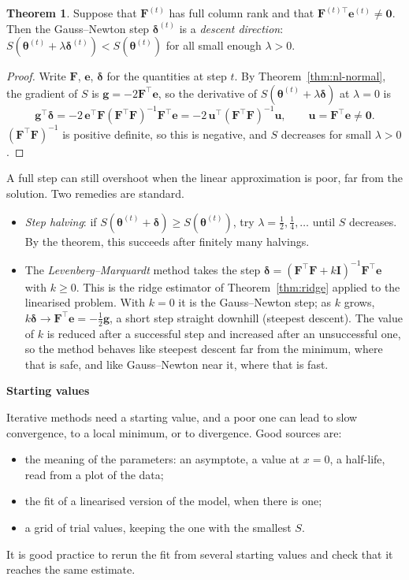 \documentclass[11pt,a4paper]{article}
\numberwithin{equation}{section}
\theoremstyle{definition}
\newtheorem{thm}{Theorem}[subsection]
\newcommand{\subhead}[1]{%
  \par\medskip\noindent\textbf{#1}\par\nobreak\smallskip}
\begin{document}
\begin{thm}\label{thm:gn-descent}
Suppose that $\mathbf{F}^{(t)}$ has full column rank and that $\mathbf{F}^{(t)\top}\mathbf{e}^{(t)} \ne \mathbf{0}$.
Then the Gauss--Newton step $\boldsymbol\delta^{(t)}$ is a \emph{descent direction}: $S(\boldsymbol\theta^{(t)} + \lambda\boldsymbol\delta^{(t)}) < S(\boldsymbol\theta^{(t)})$ for all small enough $\lambda > 0$.
\end{thm}

\begin{proof}
Write $\mathbf{F}$, $\mathbf{e}$, $\boldsymbol\delta$ for the quantities at step $t$. By Theorem~\ref{thm:nl-normal}, the gradient
of $S$ is $\mathbf{g} = -2\mathbf{F}^\top\mathbf{e}$, so the derivative of $S(\boldsymbol\theta^{(t)} + \lambda\boldsymbol\delta)$ at $\lambda = 0$ is
\[
\mathbf{g}^\top\boldsymbol\delta = -2\,\mathbf{e}^\top\mathbf{F}(\mathbf{F}^\top\mathbf{F})^{-1}\mathbf{F}^\top\mathbf{e} = -2\,\mathbf{u}^\top(\mathbf{F}^\top\mathbf{F})^{-1}\mathbf{u} , \qquad \mathbf{u} = \mathbf{F}^\top\mathbf{e} \ne \mathbf{0} .
\]
$(\mathbf{F}^\top\mathbf{F})^{-1}$ is positive definite, so this is negative, and $S$ decreases for small $\lambda > 0$.
\end{proof}

A full step can still overshoot when the linear approximation is poor, far from the solution. Two remedies
are standard.
\begin{itemize}
\item \emph{Step halving}: if $S(\boldsymbol\theta^{(t)} + \boldsymbol\delta) \ge S(\boldsymbol\theta^{(t)})$, try $\lambda = \frac12, \frac14, \dots$ until $S$ decreases. By the theorem,
this succeeds after finitely many halvings.
\item The \emph{Levenberg--Marquardt} method takes the step
$\boldsymbol\delta = (\mathbf{F}^\top\mathbf{F} + k\mathbf{I})^{-1}\mathbf{F}^\top\mathbf{e}$ with $k \ge 0$. This is the ridge estimator of Theorem~\ref{thm:ridge} applied to the
linearised problem. With $k = 0$ it is the Gauss--Newton step; as $k$ grows, $k\boldsymbol\delta \to \mathbf{F}^\top\mathbf{e} = -\frac12\mathbf{g}$, a short step
straight downhill (steepest descent). The value of $k$ is reduced after a successful step and increased after an
unsuccessful one, so the method behaves like steepest descent far from the minimum, where that is safe, and
like Gauss--Newton near it, where that is fast.
\end{itemize}

\subhead{Starting values}
Iterative methods need a starting value, and a poor one can lead to slow convergence, to a local
minimum, or to divergence. Good sources are:
\begin{itemize}
\item the meaning of the parameters: an asymptote, a value at $x = 0$, a half-life, read from a plot of the data;
\item the fit of a linearised version of the model, when there is one;
\item a grid of trial values, keeping the one with the smallest $S$.
\end{itemize}
It is good practice to rerun the fit from several starting values and check that it reaches the same estimate.
\end{document}
